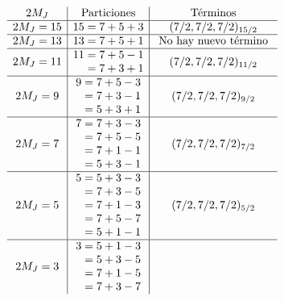 \begin{figure}[H] 
  \begin{center}
\begin{align*}
 \begin{array}{c | c | c}
   2M_{J} & \text{ Particiones } & \text{ Términos }\\
   \hline 
   2M_{J} = 15 & 15 = 7 + 5 + 3  & (7/2, 7/2, 7/2)_{15/2} \\ 
   \hline 
    2M_{J} = 13 & 13 = 7 + 5 + 1 & \text{ No hay nuevo término }\\ 
    \hline 
    2M_{J} = 11 & \begin{aligned}
     11 &= 7 + 5 -1\\
       &= 7 + 3 + 1
   \end{aligned} & (7/2, 7/2, 7/2)_{11/2} \\
   \hline 
    2M_{J} = 9 & \begin{aligned}
      9 &= 7 + 5 -3\\
        &= 7 + 3 -1\\
        &= 5 + 3 + 1\\
        \end{aligned} & (7/2, 7/2, 7/2)_{9/2}\\ 
        \hline
    2M_{J} = 7 & \begin{aligned}
      7 &= 7 + 3 - 3\\
        &= 7 + 5 - 5\\
        &= 7 + 1 - 1\\
        &= 5 + 3 - 1\\
        \end{aligned}
     & (7/2, 7/2, 7/2)_{7/2} \\
    \hline 
    2M_{J} = 5 & \begin{aligned}
      5 &= 5 + 3 - 3\\ 
        &= 7 + 3 - 5\\ 
        &= 7 + 1 - 3\\ 
        &= 7 + 5 - 7\\ 
        &= 5 + 1 - 1\\ 
        \end{aligned} & (7/2,7/2,7/2)_{5/2}\\
        \hline 
    2M_{J} = 3 & \begin{aligned}
      3 &= 5 + 1 - 3\\ 
        &= 5 + 3 - 5\\ 
        &= 7 + 1 - 5\\ 
        &= 7 + 3 - 7\\ 

\end{aligned}
\end{array}
\end{align*}
\end{center}
\end{figure}
